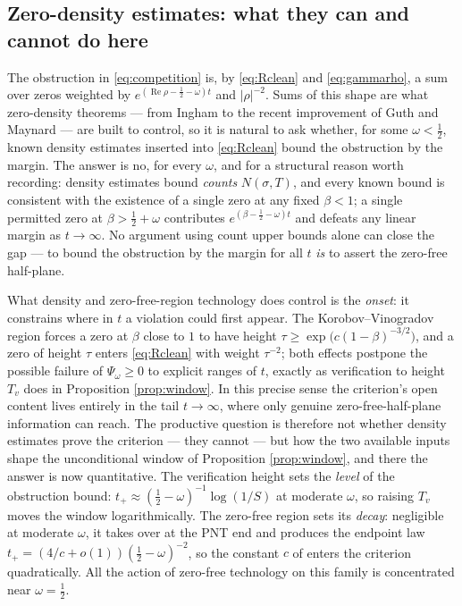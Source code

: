 \documentclass[11pt,reqno]{amsart}
\theoremstyle{plain}
\theoremstyle{definition}
\newcommand{\Rp}{\operatorname{Re}}
\begin{document}
\subsection{Zero-density estimates: what they can and cannot do here}\label{sec:zerodensity}
The obstruction in \eqref{eq:competition} is, by \eqref{eq:Rclean} and \eqref{eq:gammarho}, a sum
over zeros weighted by $e^{(\Rp\rho-\frac12-\omega)t}$ and $|\rho|^{-2}$. Sums of this shape are
what zero-density theorems --- from Ingham to the recent improvement of Guth and Maynard
\cite{GuthMaynard} --- are built to control, so it is natural to ask whether, for some
$\omega<\tfrac12$, known density estimates inserted into \eqref{eq:Rclean} bound the obstruction by
the margin. The answer is no, for every $\omega$, and for a structural reason worth recording:
density estimates bound \emph{counts} $N(\sigma,T)$, and every known bound is consistent with the
existence of a single zero at any fixed $\beta<1$; a single permitted zero at
$\beta>\tfrac12+\omega$ contributes $e^{(\beta-\frac12-\omega)t}$ and defeats any linear margin as
$t\to\infty$. No argument using count upper bounds alone can close the gap --- to bound the
obstruction by the margin for all $t$ \emph{is} to assert the zero-free half-plane.

What density and zero-free-region technology does control is the \emph{onset}: it constrains where
in $t$ a violation could first appear. The Korobov--Vinogradov region forces a zero at
$\beta$ close to $1$ to have height $\tau\ge\exp\bigl(c(1-\beta)^{-3/2}\bigr)$, and a zero of
height $\tau$ enters \eqref{eq:Rclean} with weight $\tau^{-2}$; both effects postpone the possible
failure of $\Psi_\omega\ge0$ to explicit ranges of $t$, exactly as verification to height $T_v$
does in Proposition \ref{prop:window}. In this precise sense the criterion's open content lives
entirely in the tail $t\to\infty$, where only genuine zero-free-half-plane information can reach.
The productive question is therefore not whether density estimates prove the criterion --- they
cannot --- but how the two available inputs shape the unconditional window of Proposition
\ref{prop:window}, and there the answer is now quantitative. The verification height sets the
\emph{level} of the obstruction bound: $t_{+}\approx(\tfrac12-\omega)^{-1}\log(1/S)$ at moderate
$\omega$, so raising $T_v$ moves the window logarithmically. The zero-free region sets its
\emph{decay}: negligible at moderate $\omega$, it takes over at the PNT end and produces the
endpoint law $t_{+}=(4/c+o(1))(\tfrac12-\omega)^{-2}$, so the constant $c$ of \cite{MTY} enters
the criterion quadratically. All the action of zero-free technology on this family is
concentrated near $\omega=\tfrac12$.
\end{document}
